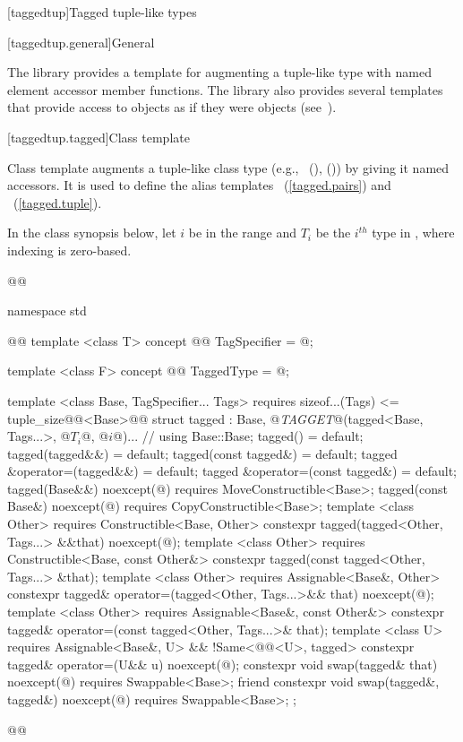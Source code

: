 {\color{addclr}
[taggedtup]{Tagged tuple-like types}

[taggedtup.general]{General}

\pnum The library provides a template for augmenting a tuple-like type with named element accessor
member functions. The library also provides several templates that provide access to 
objects as if they were  objects (see~).

[taggedtup.tagged]{Class template }

\pnum
Class template  augments a tuple-like class type (e.g., ~(),
 ()) by giving it named accessors. It is used to define the alias
templates ~(\ref{tagged.pairs}) and
~(\ref{tagged.tuple}).

\pnum In the class synopsis below, let $i$ be in the range
 and $T_i$ be the $i^{th}$ type in , where indexing
is zero-based.

%
\begin{codeblock}
@@

namespace std { @@
  template <class T>
  concept @@ TagSpecifier = @\impdef@;

  template <class F>
  concept @@ TaggedType = @\impdef@;

  template <class Base, TagSpecifier... Tags>
    requires sizeof...(Tags) <= tuple_size@@<Base>@@
  struct tagged :
    Base, @\textit{TAGGET}@(tagged<Base, Tags...>, @$T_i$@, @$i$@)... { // \seebelow
    using Base::Base;
    tagged() = default;
    tagged(tagged&&) = default;
    tagged(const tagged&) = default;
    tagged &operator=(tagged&&) = default;
    tagged &operator=(const tagged&) = default;
    tagged(Base&&) noexcept(@\seebelow@)
      requires MoveConstructible<Base>;
    tagged(const Base&) noexcept(@\seebelow@)
      requires CopyConstructible<Base>;
    template <class Other>
      requires Constructible<Base, Other>
    constexpr tagged(tagged<Other, Tags...> &&that) noexcept(@\seebelow@);
    template <class Other>
      requires Constructible<Base, const Other&>
    constexpr tagged(const tagged<Other, Tags...> &that);
    template <class Other>
      requires Assignable<Base&, Other>
    constexpr tagged& operator=(tagged<Other, Tags...>&& that) noexcept(@\seebelow@);
    template <class Other>
      requires Assignable<Base&, const Other&>
    constexpr tagged& operator=(const tagged<Other, Tags...>& that);
    template <class U>
      requires Assignable<Base&, U> && !Same<@@<U>, tagged>
    constexpr tagged& operator=(U&& u) noexcept(@\seebelow@);
    constexpr void swap(tagged& that) noexcept(@\seebelow@)
      requires Swappable<Base>;
    friend constexpr void swap(tagged&, tagged&) noexcept(@\seebelow@)
      requires Swappable<Base>;
  };
}@\oldtxt{\}\}\}}@
\end{codeblock}

}

